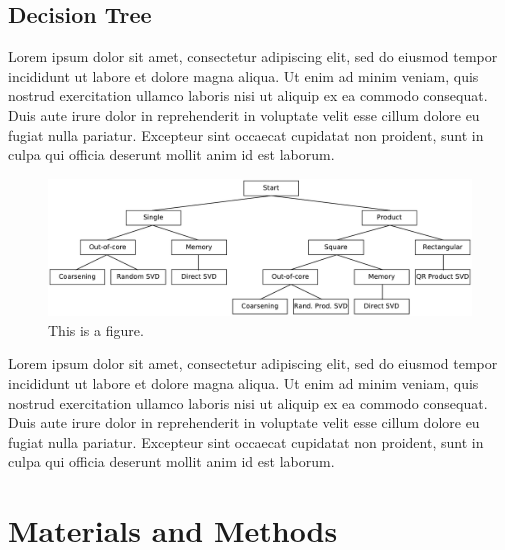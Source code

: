\documentclass[ijgi,article,submit,moreauthors,pdftex,10pt,a4paper]{Definitions/mdpi}
\begin{document}
\subsection{Decision Tree}
\label{sec:Introduction/Decision Tree}

Lorem ipsum dolor sit amet, consectetur adipiscing elit, sed do eiusmod tempor incididunt ut labore et dolore magna aliqua. Ut enim ad minim veniam, quis nostrud exercitation ullamco laboris nisi ut aliquip ex ea commodo consequat. Duis aute irure dolor in reprehenderit in voluptate velit esse cillum dolore eu fugiat nulla pariatur. Excepteur sint occaecat cupidatat non proident, sunt in culpa qui officia deserunt mollit anim id est laborum.

\begin{figure}[H]
\centering
\includegraphics[width=120mm]{Results/FlowDiagram.pdf}
\caption{This is a figure.}
\label{fig:FlowDiagram}
\end{figure}

Lorem ipsum dolor sit amet, consectetur adipiscing elit, sed do eiusmod tempor incididunt ut labore et dolore magna aliqua. Ut enim ad minim veniam, quis nostrud exercitation ullamco laboris nisi ut aliquip ex ea commodo consequat. Duis aute irure dolor in reprehenderit in voluptate velit esse cillum dolore eu fugiat nulla pariatur. Excepteur sint occaecat cupidatat non proident, sunt in culpa qui officia deserunt mollit anim id est laborum.

\section{Materials and Methods}
\label{sec:Materials and Methods}

\end{document}
